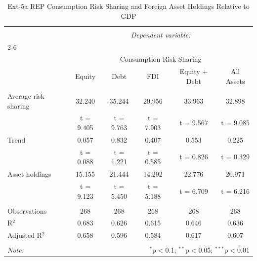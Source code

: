 
\begin{table}[!htbp] \centering 
  \caption{Ext-5a REP Consumption Risk Sharing and Foreign Asset Holdings Relative to GDP} 
  \label{} 
\begin{tabular}{@{\extracolsep{5pt}}lccccc} 
\\[-1.8ex]\hline 
\hline \\[-1.8ex] 
 & \multicolumn{5}{c}{\textit{Dependent variable:}} \\ 
\cline{2-6} 
\\[-1.8ex] & \multicolumn{5}{c}{Consumption Risk Sharing} \\ 
 & Equity & Debt & FDI & Equity + Debt & All Assets \\ 
\hline \\[-1.8ex] 
 Average risk sharing & 32.240 & 35.244 & 29.956 & 33.963 & 32.898 \\ 
  & t = 9.405 & t = 9.763 & t = 7.903 & t = 9.567 & t = 9.085 \\ 
  Trend & 0.057 & 0.832 & 0.407 & 0.553 & 0.225 \\ 
  & t = 0.088 & t = 1.221 & t = 0.585 & t = 0.826 & t = 0.329 \\ 
  Asset holdings & 15.155 & 21.444 & 14.292 & 22.776 & 20.971 \\ 
  & t = 9.123 & t = 5.450 & t = 5.188 & t = 6.709 & t = 6.216 \\ 
 \hline \\[-1.8ex] 
Observations & 268 & 268 & 268 & 268 & 268 \\ 
R$^{2}$ & 0.683 & 0.626 & 0.615 & 0.646 & 0.636 \\ 
Adjusted R$^{2}$ & 0.658 & 0.596 & 0.584 & 0.617 & 0.607 \\ 
\hline 
\hline \\[-1.8ex] 
\textit{Note:}  & \multicolumn{5}{r}{$^{*}$p$<$0.1; $^{**}$p$<$0.05; $^{***}$p$<$0.01} \\ 
\end{tabular} 
\end{table} 
